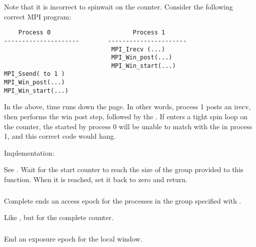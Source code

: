 \documentclass{article}
\begin{document}
Note that it is incorrect to spinwait on the counter.  Consider the following
correct MPI program:
\begin{verbatim}
    Process 0                       Process 1
---------------------        ----------------------
                              MPI_Irecv (...)
                              MPI_Win_post(...)
                              MPI_Win_start(...)
MPI_Ssend( to 1 )
MPI_Win_post(...)
MPI_Win_start(...)
\end{verbatim}
In the above, time runs down the page.  In other words, process 1 posts an
irecv, then performs the win post step, followed by the
.  If  enters a tight spin loop
on the counter, the  started by process 0 will be unable to
match with the  in process 1, and this correct code would
hang.  

Implementation:

See .  Wait for the start counter to reach the size of
the group provided to this function.  When it is reached, set it back to zero
and return.  


\subsubsection{}
Complete ends an access epoch for the processes in the group specified with
.

Like , but for the complete counter.

\subsubsection{}
End an exposure epoch for the local window.
\end{document}
